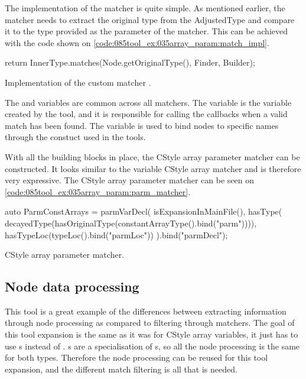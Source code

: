The implementation of the matcher is quite simple. As mentioned earlier, the matcher needs to extract the original type from the AdjustedType and compare it to the type provided as the parameter of the matcher. This can be achieved with the code shown on \cref{code:085tool_ex:035array_param:match_impl}.

\begin{listing}[H]
    \begin{cppcode}
return InnerType.matches(Node.getOriginalType(), Finder, Builder);
    \end{cppcode}
    \caption{Implementation of the custom matcher .}
    \label{code:085tool_ex:035array_param:match_impl}
\end{listing}

The  and  variables are common across all matchers. The  variable is the  variable created by the tool, and it is responsible for calling the callbacks when a valid match has been found. The  variable is used to bind nodes to specific names through the  constuct used in the tools.

With all the building blocks in place, the CStyle array parameter matcher can be constructed. It looks similar to the variable CStyle array matcher and is therefore very expressive. The CStyle array parameter matcher can be seen on \cref{code:085tool_ex:035array_param:parm_matcher}.

\begin{listing}[H]
    \begin{cppcode}
auto ParmConstArrays = parmVarDecl(
        isExpansionInMainFile(),
        hasType(
            decayedType(hasOriginalType(constantArrayType().bind("parm")))),
        hasTypeLoc(typeLoc().bind("parmLoc")) 
    ).bind("parmDecl");
    \end{cppcode}
    \caption{CStyle array parameter matcher.}
    \label{code:085tool_ex:035array_param:parm_matcher}
\end{listing}

\subsection{Node data processing}

This tool is a great example of the differences between extracting information through node processing as compared to filtering through matchers. The goal of this tool expansion is the same as it was for CStyle array variables, it just has to use s instead of . s are a specialisation of s, so all the node processing is the same for both types. Therefore the node processing can be reused for this tool expansion, and the different match filtering is all that is needed.

\subsection{}